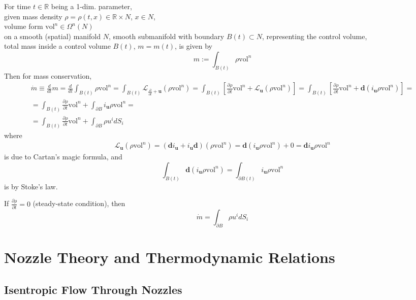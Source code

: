 \documentclass[10pt]{amsart}
\begin{document}
\begin{multicols*}{2}
For time $t\in \mathbb{R}$ being a 1-dim. parameter, \\
given mass density $\rho = \rho(t,x) \in \mathbb{R} \times N$, $x\in N$, \\
volume form $\text{vol}^n\in \Omega^n(N)$ \\
on a smooth (spatial) manifold $N$, smooth submanifold with boundary $B(t) \subset N$, representing the control volume, \\
total mass inside a control volume $B(t)$, $m=m(t)$, is given by 
\[
m := \int_{B(t)} \rho \text{vol}^n
\]
Then for mass conservation,
\[
\begin{gathered}
\dot{m} \equiv \frac{d}{dt} m = \frac{d}{dt} \int_{B(t)} \rho \text{vol}^n = \int_{B(t)} \mathcal{L}_{\frac{\partial}{\partial t} + \mathbf{u}} (\rho \text{vol}^n) = \int_{B(t)} \left[ \frac{ \partial \rho }{ \partial t} \text{vol}^n + \mathcal{L}_{\mathbf{u}} (\rho \text{vol}^n) \right] = \int_{B(t)} \left[ \frac{ \partial \rho }{ \partial t} \text{vol}^n + \mathbf{d}(i_{\mathbf{u}} \rho \text{vol}^n) \right] = \\ 
 = \int_{B(t)} \frac{ \partial \rho }{ \partial t} \text{vol}^n + \int_{\partial B} i_{\mathbf{u}} \rho \text{vol}^n = \\
 = \int_{B(t)} \frac{ \partial \rho }{ \partial t} \text{vol}^n + \int_{\partial B}\rho u^i dS_i 
\end{gathered}
\]
where 
\[
\begin{gathered}
\mathcal{L}_{\mathbf{u}} (\rho \text{vol}^n ) = (\mathbf{d} i_{\mathbf{u}} + i_{\mathbf{u}} \mathbf{d}) (\rho \text{vol}^n) = \mathbf{d}(i_{\mathbf{u}} \rho \text{vol}^n) + 0 = \mathbf{d}i_{\mathbf{u}} \rho \text{vol}^n
\end{gathered} 
\]
is due to Cartan's magic formula, and 
\[
\int_{B(t)} \mathbf{d} (i_{\mathbf{u}} \rho \text{vol}^n) = \int_{\partial B(t)} i_{\mathbf{u}} \rho \text{vol}^n
\]
is by Stoke's law.


If $\frac{ \partial \rho }{ \partial t} = 0$ (steady-state condition), then
\[
\dot{m} = \int_{\partial B} \rho u^i dS_i
\]



\section{Nozzle Theory and Thermodynamic Relations}

\subsection{Isentropic Flow Through Nozzles}


\end{multicols*}
\end{document}
